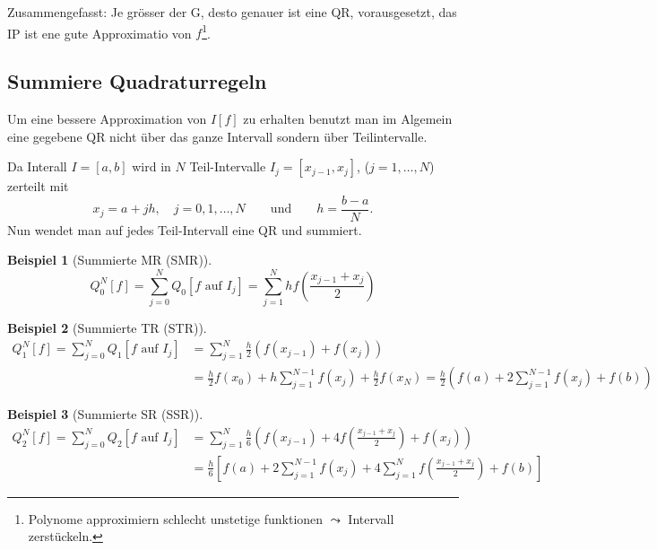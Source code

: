 \documentclass[a4paper]{article}
\newtheorem{bsp}{Beispiel}
\begin{document}

Zusammengefasst: Je grösser der G, desto genauer ist eine QR, vorausgesetzt,
das IP ist ene gute Approximatio von $f$\footnote{Polynome approximiern
schlecht unstetige funktionen $\leadsto$ Intervall zerstückeln.}.

\subsection{Summiere Quadraturregeln}

Um eine bessere Approximation von $I[f]$ zu erhalten benutzt man im Algemein
eine gegebene QR nicht über das ganze Intervall sondern über Teilintervalle.
\begin{center}
  \skelfig
\end{center}

Da Interall $I = [a,b]$ wird in $N$ Teil-Intervalle $I_j = [x_{j-1},x_j]$, ($j
= 1,\ldots,N$) zerteilt mit
\[
  x_j = a + jh, \quad j = 0,1,\ldots,N
  \qquad \text{und} \qquad
  h = \frac{b - a}{N}.
\]
Nun wendet man auf jedes Teil-Intervall eine QR und summiert.

\begin{bsp}[Summierte MR (SMR)]
  \[
    Q_0^N[f] = \sum_{j=0}^N Q_0[f \text{ auf } I_j]
      = \sum_{j=1}^N h f \left( \frac{x_{j-1} + x_j}{2} \right)
  \]
\end{bsp}

\begin{bsp}[Summierte TR (STR)]
  \begin{align*}
    Q_1^N[f] = \sum_{j=0}^N Q_1[f \text{ auf } I_j]
      &= \sum_{j=1}^N \frac{h}{2} \left(
        f(x_{j-1}) + f(x_j)
        \right) \\
      &= \frac{h}{2} f(x_0) + h \sum_{j=1}^{N-1} f(x_j)
        + \frac{h}{2} f(x_N)
      = \frac{h}{2} \left( f(a) + 2 \sum_{j=1}^{N-1} f(x_j) + f(b) \right)
  \end{align*}
\end{bsp}

\begin{bsp}[Summierte SR (SSR)]
  \begin{align*}
    Q_2^N[f] = \sum_{j=0}^N Q_2[f \text{ auf } I_j]
      &= \sum_{j=1}^N \frac{h}{6} \left(
          f(x_{j-1})
          + 4 f\left( \frac{x_{j-1} + x_j}{2} \right)
          + f(x_j)
        \right) \\
      &= \frac{h}{6} \left[ f(a) + 2 \sum_{j=1}^{N-1} f(x_j)
        + 4 \sum_{j=1}^N f \left( \frac{x_{j-1} + x_j}{2} \right)
        + f(b) \right]
  \end{align*}
\end{bsp}
\end{document}
